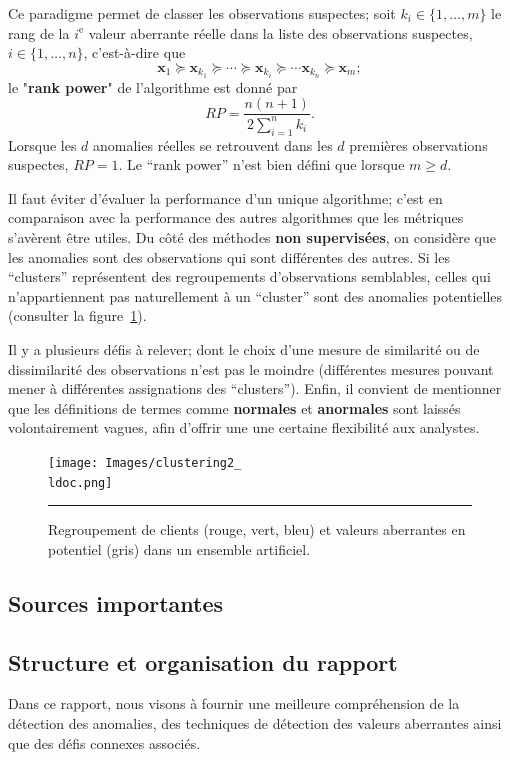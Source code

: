 \par Ce paradigme permet de classer les ob\-ser\-va\-tions suspectes; soit $k_i\in\{1,\ldots,m\}$ le rang de la $i^{\text{e}}$ valeur aberrante r\'eelle dans la liste des ob\-ser\-va\-tions suspectes, $i\in \{1,\ldots,n\}$, c'est-\`a-dire que $$\mathbf{x}_1\succeq\mathbf{x}_{k_1}\succeq \cdots\succeq\mathbf{x}_{k_i}\succeq \cdots \mathbf{x}_{k_n}\succeq \mathbf{x}_m;$$ le "\textbf{rank power}" de l'algorithme est donn\'e par $$RP=\frac{n(n+1)}{2\sum_{i=1}^nk_i}.$$ Lorsque les $d$ anomalies réelles se retrouvent dans les $d$ premières ob\-ser\-va\-tions suspectes, $RP= 1$. Le ``rank power'' n'est bien défini que lorsque $m\geq d$. \par Il faut \'eviter d'\'evaluer la performance d'un unique algorithme; c'est en comparaison avec la performance des autres algorithmes que les m\'etriques s'av\`erent \^etre utiles.  \newl Du côté des m\'ethodes \textbf{non supervis\'ees}, on consid\`ere que les anomalies sont des ob\-ser\-va\-tions qui sont différentes des autres. Si les ``clusters'' représentent des regroupements d'ob\-ser\-va\-tions semblables, celles qui n'appartiennent pas naturellement \`a un ``cluster'' sont des anomalies potentielles (consulter la figure~\ref{fig:clust2}). \par Il y a plusieurs d\'efis \`a relever; dont le choix  d'une mesure de similarité ou de dissimilarité des observations n'est pas le moindre (différentes mesures pouvant mener à différentes assignations des ``clusters''). \newl Enfin, il convient de mentionner que les définitions de termes comme \textbf{normales} et \textbf{anormales} sont laiss\'es volontairement vagues, afin d'offrir une  une certaine flexibilité aux analystes. 
\begin{figure}[t]
\centering
\texttt{[image: Images/clustering2\_\\ldoc.png]}
\caption{\small Regroupement de clients (rouge, vert, bleu) et valeurs aberrantes en potentiel (gris) dans un ensemble artificiel.}\hrule\label{fig:clust2}
\end{figure}

\subsection{Sources importantes}
\newpage
\subsection{Structure et organisation du rapport}
Dans ce rapport, nous visons à fournir une meilleure compréhension de la détection des anomalies, des techniques de détection des valeurs aberrantes ainsi que des défis connexes associés. 


